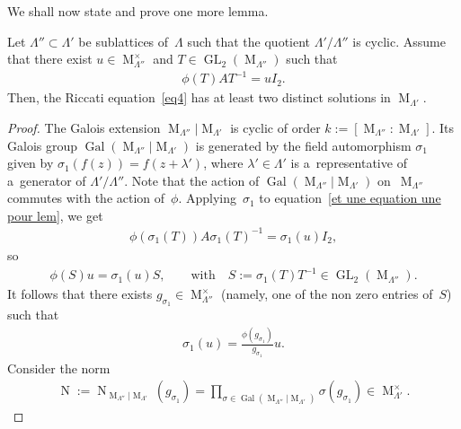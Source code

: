 We shall now state and prove one more lemma.

\begin{Lemma}
\label{lem descente}
Let $\Lambda'' \subset \Lambda'$ be sublattices of~$\Lambda$ such that the quotient $\Lambda'/\Lambda''$ is cyclic.
Assume that there exist $u \in \operatorname{M}_{\Lambda''}^{\times}$ and $T \in
\operatorname{GL}_{2}(\operatorname{M}_{\Lambda''})$ such that
\begin{gather}
\label{et une equation une pour lem}
\phi(T)AT^{-1}=u I_{2}.
\end{gather}
Then, the Riccati equation~\eqref{eq4} has at least two distinct solutions in $\operatorname{M}_{\Lambda'}$.
\end{Lemma}

\begin{proof}
The Galois extension $ \operatorname{M}_{\Lambda''} \vert \operatorname{M}_{\Lambda'} $ is cyclic of order
$k:=[\operatorname{M}_{\Lambda''}: \operatorname{M}_{\Lambda'}]$.
Its Galois group $\operatorname{Gal}(\operatorname{M}_{\Lambda''}|\operatorname{M}_{\Lambda'})$ is generated by the
f\/ield automorphism $\sigma_{1}$ given by $\sigma_{1}(f(z))=f(z+\lambda')$, where $\lambda' \in \Lambda'$ is
a~representative of a~generator of $\Lambda'/\Lambda''$.
Note that the action of $\operatorname{Gal}(\operatorname{M}_{\Lambda''}|\operatorname{M}_{\Lambda'})$ on~$\operatorname{M}_{\Lambda''}$ commutes with the action of~$\phi$.
Applying~$\sigma_{1}$ to equation~\eqref{et une equation une pour lem}, we get
\begin{gather*}
\phi(\sigma_{1} (T))A\sigma_{1}(T)^{-1}=\sigma_{1}(u) I_{2},
\end{gather*}
so
\begin{gather*}
\phi(S)u=\sigma_{1}(u) S, \qquad \text{with} \quad S:=\sigma_{1}(T) T^{-1} \in \operatorname{GL}_{2}(\operatorname{M}_{\Lambda''}).
\end{gather*}
It follows that there exists $g_{\sigma_{1}}\in \operatorname{M}_{\Lambda''}^{\times}$ (namely, one of the non zero
entries of~$S$) such that
\begin{gather*}
\sigma_{1}(u)=\frac{\phi (g_{\sigma_{1}})}{g_{\sigma_{1}}}u.
\end{gather*}
Consider the norm
\begin{gather*}
\operatorname{N}:=\operatorname{N}_{\operatorname{M}_{\Lambda''}|\operatorname{M}_{\Lambda'}}(g_{\sigma_1})=
\prod\limits_{\sigma \in \operatorname{Gal}(\operatorname{M}_{\Lambda''}|\operatorname{M}_{\Lambda'})} \sigma
(g_{\sigma_1}) \in \operatorname{M}_{\Lambda'}^{\times}.

\end{gather*}
\end{proof}
